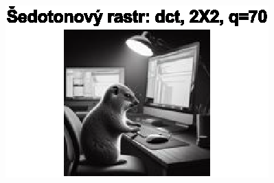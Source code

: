 \begin{figure}[H]
\begin{minipage}[b]{0.3\textwidth}
        \includegraphics[width=\textwidth]{images/sedo_dct_2X2_q70.eps}
    \end{minipage}
\end{figure}

